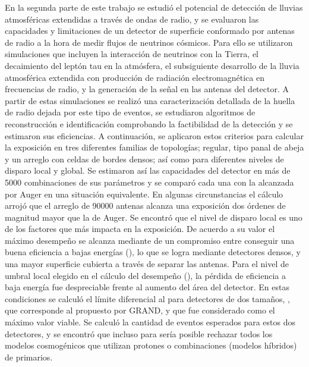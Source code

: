 En la segunda parte de este trabajo se estudi\'o el potencial de detecci\'on de  lluvias atmosf\'ericas extendidas a trav\'es de ondas de radio,
y se evaluaron las capacidades y limitaciones de un detector de superficie conformado por antenas de radio a la hora de medir flujos de neutrinos c\'osmicos.
Para ello se utilizaron simulaciones que incluyen la interacci\'on de neutrinos con la Tierra, el decaimiento del lept\'on tau en la atm\'osfera, el subsiguiente desarrollo de la lluvia atmosf\'erica extendida con producci\'on de radiaci\'on electromagn\'etica en frecuencias de radio, y la generaci\'on de la se\~nal en las antenas del detector.
A partir de estas simulaciones se realiz\'o una caracterizaci\'on detallada de la huella de radio dejada por este tipo de eventos, 
se estudiaron algoritmos de reconstrucci\'on e identificaci\'on comprobando la factibilidad de la detecci\'on y se estimaron sus eficiencias.
A continuaci\'on, se aplicaron estos criterios para calcular la exposici\'on en tres diferentes familias de topolog\'ias; regular, tipo panal de abeja y un arreglo con celdas de bordes densos; as\'i como para diferentes niveles de disparo local y global.
Se estimaron as\'i las capacidades del detector en m\'as de 5000 combinaciones de sus par\'ametros y se compar\'o cada una con la alcanzada por Auger en una situaci\'on equivalente.
En algunas circunstancias el c\'alculo arroj\'o que el arreglo de 90000 antenas alcanza una exposici\'on dos \'ordenes de magnitud mayor que la de Auger.
Se encontr\'o que el nivel de disparo local es uno de los factores que m\'as impacta en la exposici\'on.
De acuerdo a su valor el m\'aximo desempe\~no se alcanza mediante de un compromiso entre conseguir una buena eficiencia a bajas energ\'ias (), lo que se logra mediante detectores densos, y una mayor superficie cubierta a trav\'es de separar las antenas.
Para el nivel de umbral local elegido en el c\'alculo del desempe\~no (), la p\'erdida de eficiencia a baja energ\'ia fue despreciable frente al aumento del \'area del detector. En estas condiciones se calcul\'o el l\'imite diferencial al  para detectores de dos tama\~nos, , que corresponde al propuesto por GRAND, y  que fue considerado como el m\'aximo valor viable.
Se calcul\'o la cantidad de eventos esperados para estos dos detectores, y se encontr\'o que incluso para  ser\'ia posible rechazar todos los modelos cosmog\'enicos que utilizan protones o combinaciones (modelos h\'ibridos) de primarios.
